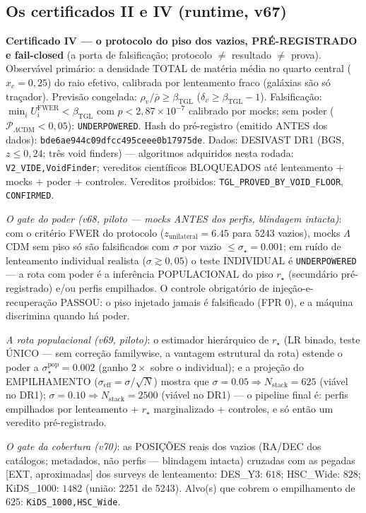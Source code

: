 \documentclass[11pt]{article}
\newcommand{\bTGL}{\beta_{\mathrm{TGL}}}\newcommand{\Msun}{M_{\odot}}\newcommand{\TGL}{\mathrm{TGL}}
\theoremstyle{definition}\newtheorem{deriv}{Derivação}
\begin{document}
\subsection*{Os certificados II e IV (runtime, v67)}

\textbf{Certificado IV --- o protocolo do piso dos vazios, PRÉ-REGISTRADO e fail-closed} (a porta de falsificação; protocolo $\neq$ resultado $\neq$ prova). Observável primário: a densidade TOTAL de matéria média no quarto central ($x_c=0{,}25$) do raio efetivo, calibrada por lenteamento fraco (galáxias são só traçador). Previsão congelada: $\rho_v/\bar\rho\ge\bTGL$ ($\delta_v\ge\bTGL-1$). Falsificação: $\min_i U_i^{\mathrm{FWER}}<\bTGL$ com $p<2{,}87\times10^{-7}$ calibrado por mocks; sem poder ($\mathcal P_{\Lambda\mathrm{CDM}}<0{,}05$): \texttt{UNDERPOWERED}. Hash do pré-registro (emitido ANTES dos dados): \texttt{bde6ae944c09dfcc495ceee0b17975de}. Dados: DESIVAST DR1 (BGS, $z\le0{,}24$; três void finders) --- algoritmos adquiridos nesta rodada: \texttt{V2\_VIDE,VoidFinder}; vereditos científicos BLOQUEADOS até lenteamento $+$ mocks $+$ poder $+$ controles. Vereditos proibidos: \texttt{TGL\_PROVED\_BY\_VOID\_FLOOR}, \texttt{CONFIRMED}.

\emph{O gate do poder (v68, piloto --- mocks ANTES dos perfis, blindagem intacta)}: com o critério FWER do protocolo ($z_{\mathrm{unilateral}}=6.45$ para $5243$ vazios), mocks $\Lambda$CDM sem piso só são falsificados com $\sigma$ por vazio $\le\sigma_\star=0.001$; em ruído de lenteamento individual realista ($\sigma\gtrsim0{,}05$) o teste INDIVIDUAL é \texttt{UNDERPOWERED} --- a rota com poder é a inferência POPULACIONAL do piso $r_\star$ (secundário pré-registrado) e/ou perfis empilhados. O controle obrigatório de injeção-e-recuperação PASSOU: o piso injetado jamais é falsificado (FPR $0$), e a máquina discrimina quando há poder.

\emph{A rota populacional (v69, piloto)}: o estimador hierárquico de $r_\star$ (LR binado, teste ÚNICO --- sem correção familywise, a vantagem estrutural da rota) estende o poder a $\sigma^{\mathrm{pop}}_\star=0.002$ (ganho $2\times$ sobre o individual); e a projeção do EMPILHAMENTO ($\sigma_{\mathrm{eff}}=\sigma/\sqrt{N}$) mostra que $\sigma=0.05\Rightarrow N_{\mathrm{stack}}=625$ (viável no DR1); $\sigma=0.10\Rightarrow N_{\mathrm{stack}}=2500$ (viável no DR1) --- o pipeline final é: perfis empilhados por lenteamento $+$ $r_\star$ marginalizado $+$ controles, e só então um veredito pré-registrado.

\emph{O gate da cobertura (v70)}: as POSIÇÕES reais dos vazios (RA/DEC dos catálogos; metadados, não perfis --- blindagem intacta) cruzadas com as pegadas [EXT, aproximadas] dos surveys de lenteamento: DES\_Y3: $618$; HSC\_Wide: $828$; KiDS\_1000: $1482$ (união: 2251 de 5243). Alvo(s) que cobrem o empilhamento de $625$: \texttt{KiDS\_1000,HSC\_Wide}.
\end{document}
